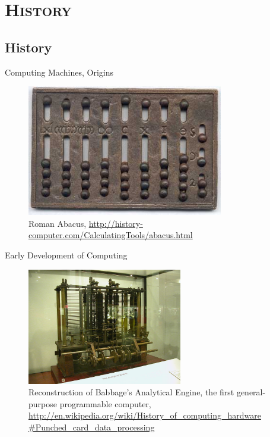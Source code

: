 \documentclass[xcolor=x11names,compress]{beamer}
\renewcommand{\(}{\begin{columns}}
\renewcommand{\)}{\end{columns}}
\newcommand{\<}[1]{\begin{column}{#1}}
\renewcommand{\>}{\end{column}}
\begin{document}
\section{\scshape History}
\subsection{History}
\begin{frame}{Computing Machines, Origins}
\begin{figure}
\includegraphics[height=2.25in,clip]{RomanAbacus}
\caption{Roman Abacus, \href{http://history-computer.com/CalculatingTools/abacus.html}{http://history-computer.com/CalculatingTools/abacus.html}}
\end{figure}

\end{frame}

\begin{frame}{Early Development of Computing}

\begin{figure}
\includegraphics[height=2in,clip]{BabbageDiffMachine}
\caption{Reconstruction of Babbage's Analytical Engine, the first general-purpose programmable computer, \href{http://en.wikipedia.org/wiki/History_of_computing_hardware
\#Punched_card_data_processing}{http://en.wikipedia.org/wiki/History\_of\_computing\_hardware
\#Punched\_card\_data\_processing}}
\end{figure}

\end{frame}
\end{document}
